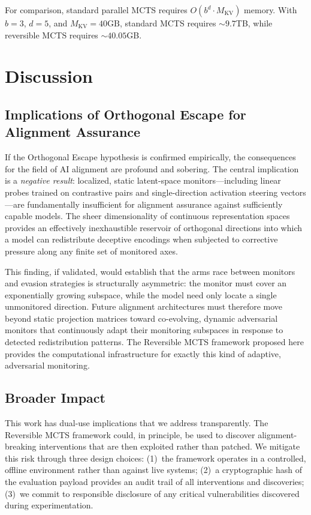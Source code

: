 \documentclass[10pt]{article}
\begin{document}
For comparison, standard parallel MCTS requires $O(b^d \cdot M_{\text{KV}})$ memory. With $b = 3$, $d = 5$, and $M_{\text{KV}} = 40\text{GB}$, standard MCTS requires ${\sim}9.7$TB, while reversible MCTS requires ${\sim}40.05$GB.

\section{Discussion}

\subsection{Implications of Orthogonal Escape for Alignment Assurance}

If the Orthogonal Escape hypothesis is confirmed empirically, the consequences for the field of AI alignment are profound and sobering. The central implication is a \emph{negative result}: localized, static latent-space monitors---including linear probes trained on contrastive pairs and single-direction activation steering vectors---are fundamentally insufficient for alignment assurance against sufficiently capable models. The sheer dimensionality of continuous representation spaces provides an effectively inexhaustible reservoir of orthogonal directions into which a model can redistribute deceptive encodings when subjected to corrective pressure along any finite set of monitored axes.

This finding, if validated, would establish that the arms race between monitors and evasion strategies is structurally asymmetric: the monitor must cover an exponentially growing subspace, while the model need only locate a single unmonitored direction. Future alignment architectures must therefore move beyond static projection matrices toward co-evolving, dynamic adversarial monitors that continuously adapt their monitoring subspaces in response to detected redistribution patterns. The Reversible MCTS framework proposed here provides the computational infrastructure for exactly this kind of adaptive, adversarial monitoring.

\subsection{Broader Impact}

This work has dual-use implications that we address transparently. The Reversible MCTS framework could, in principle, be used to discover alignment-breaking interventions that are then exploited rather than patched. We mitigate this risk through three design choices: (1)~the framework operates in a controlled, offline environment rather than against live systems; (2)~a cryptographic hash of the evaluation payload provides an audit trail of all interventions and discoveries; (3)~we commit to responsible disclosure of any critical vulnerabilities discovered during experimentation.
\end{document}
